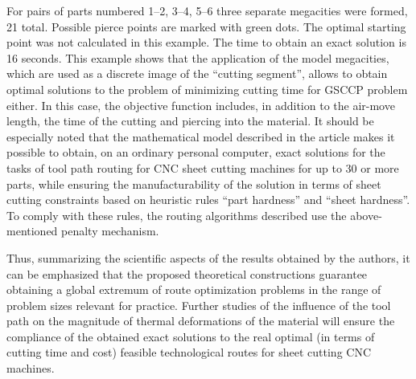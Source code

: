 \documentclass[10pt]{article}
\begin{document}
For pairs of parts numbered 1--2, 3--4, 5--6
three separate megacities were formed,
21 total.
Possible pierce points are marked with green dots.
The optimal starting point was not calculated in this example.
The time to obtain an exact solution is 16 seconds.
This example shows that the application of the model megacities,
which are used as a discrete image of the ``cutting segment'',
allows to obtain optimal solutions to the problem of
minimizing cutting time for GSCCP problem either.
In this case,
the objective function includes,
in addition to the air-move length,
the time of the cutting and piercing into the material.
It should be especially noted
that the mathematical model described in the article
makes it possible to obtain,
on an ordinary personal computer,
exact solutions for the tasks of tool path routing for CNC sheet cutting machines
for up to 30 or more parts,
while ensuring the manufacturability of the solution in terms of sheet cutting constraints based on heuristic rules
``part hardness'' and
``sheet hardness''.
To comply with these rules,
the routing algorithms described
use the above-mentioned penalty mechanism.

Thus,
summarizing the scientific aspects of the results obtained by the authors,
it can be emphasized that the proposed
theoretical constructions guarantee obtaining a global extremum
of route optimization problems
in the range of problem sizes relevant for practice.
Further studies of the influence of the tool path on
the magnitude of thermal deformations of the material will ensure
the compliance of the obtained exact solutions
to the real optimal
(in terms of cutting time and cost)
feasible technological routes
for sheet cutting CNC machines.



\end{document}
